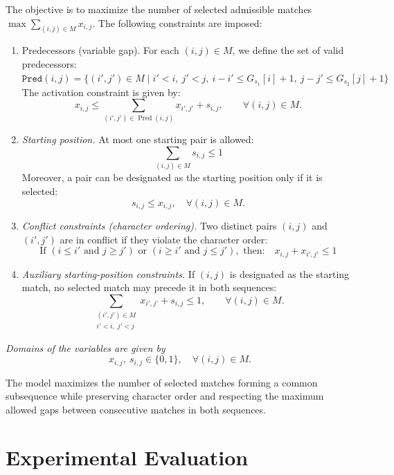 \documentclass[runningheads]{llncs}
\begin{document}
	The objective is to maximize the number of selected admissible matches $
	\max \sum_{(i,j) \in M} x_{i,j}$. The following constraints are imposed:
	
	\begin{enumerate}
		\item \textrm{Predecessors (variable gap).}  
		For each $(i,j) \in M$, we define the set of valid predecessors: $
		\texttt{Pred}(i,j) =
		\{ (i',j') \in M \mid i' < i,\ j' < j,\ i - i' \leq G_{s_1}[i] + 1,\ j - j' \leq G_{s_2}[j] + 1 \}$
		The activation constraint is given by:
		\[
		x_{i,j} \leq \sum_{(i',j') \in \operatorname{Pred}(i,j)} x_{i',j'} + s_{i,j},
		\qquad \forall (i,j)\in M.
		\]
		
		\item \textit{Starting position.}  
		At most one starting pair is allowed:
		\[
		\sum_{(i,j) \in M} s_{i,j} \leq 1
		\]
		Moreover, a pair can be designated as the starting position only if it is selected:
		\[
		s_{i,j} \leq x_{i,j}, \quad \forall (i,j) \in M.
		\]
		
		\item \textit{Conflict constraints (character ordering).}  
		Two distinct pairs $(i,j)$ and $(i',j')$ are in conflict if they violate the character order:
		\[
		\textrm{If } (i \leq i' \textrm{ and } j \geq j') \textrm{ or }
		(i \geq i' \textrm{ and } j \leq j'), \textrm{ then:}
		\quad x_{i,j} + x_{i',j'} \leq 1
		\]
		\item \textit{Auxiliary starting-position constraints.}
		If $(i,j)$ is designated as the starting match, no selected match may precede it in both sequences:
		\[
		\sum_{\substack{(i',j')\in M\\ i'<i,\;j'<j}} x_{i',j'} + s_{i,j} \leq 1,
		\qquad \forall (i,j)\in M.
		\]
	\end{enumerate}
	
	
	\textit{Domains of the variables are given by}
	\[
	x_{i,j},\ s_{i,j} \in \{0,1\}, \quad \forall (i,j) \in M.
	\]
	
	The model maximizes the number of selected matches forming a common subsequence while preserving character order and respecting the maximum allowed gaps between consecutive matches in both sequences.
	
	
	\section{Experimental Evaluation}\label{sec: experiments}
	
\end{document}
